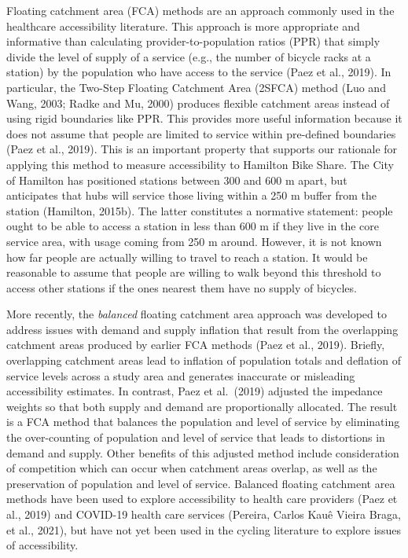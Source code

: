 \documentclass[]{elsarticle} %
\begin{document}
Floating catchment area (FCA) methods are an approach commonly used in
the healthcare accessibility literature. This approach is more
appropriate and informative than calculating provider-to-population
ratios (PPR) that simply divide the level of supply of a service (e.g.,
the number of bicycle racks at a station) by the population who have
access to the service (Paez et al., 2019). In particular, the Two-Step
Floating Catchment Area (2SFCA) method (Luo and Wang, 2003; Radke and
Mu, 2000) produces flexible catchment areas instead of using rigid
boundaries like PPR. This provides more useful information because it
does not assume that people are limited to service within pre-defined
boundaries (Paez et al., 2019). This is an important property that
supports our rationale for applying this method to measure accessibility
to Hamilton Bike Share. The City of Hamilton has positioned stations
between 300 and 600 m apart, but anticipates that hubs will service
those living within a 250 m buffer from the station (Hamilton, 2015b).
The latter constitutes a normative statement: people ought to be able to
access a station in less than 600 m if they live in the core service
area, with usage coming from 250 m around. However, it is not known how
far people are actually willing to travel to reach a station. It would
be reasonable to assume that people are willing to walk beyond this
threshold to access other stations if the ones nearest them have no
supply of bicycles.

More recently, the \emph{balanced} floating catchment area approach was
developed to address issues with demand and supply inflation that result
from the overlapping catchment areas produced by earlier FCA methods
(Paez et al., 2019). Briefly, overlapping catchment areas lead to
inflation of population totals and deflation of service levels across a
study area and generates inaccurate or misleading accessibility
estimates. In contrast, Paez et al.~(2019) adjusted the impedance
weights so that both supply and demand are proportionally allocated. The
result is a FCA method that balances the population and level of service
by eliminating the over-counting of population and level of service that
leads to distortions in demand and supply. Other benefits of this
adjusted method include consideration of competition which can occur
when catchment areas overlap, as well as the preservation of population
and level of service. Balanced floating catchment area methods have been
used to explore accessibility to health care providers (Paez et al.,
2019) and COVID-19 health care services (Pereira, Carlos Kauê Vieira
Braga, et al., 2021), but have not yet been used in the cycling
literature to explore issues of accessibility.
\end{document}
